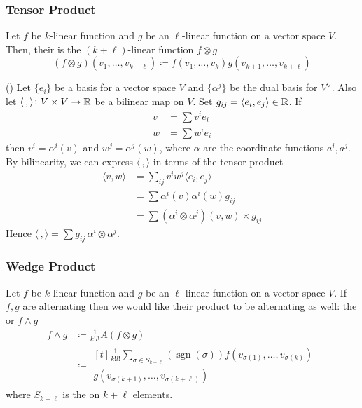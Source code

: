 \subsubsection{Tensor Product}

Let \(f\) be \(k\)-linear function and \(g\) be an \(\ell\)-linear function on a vector space \(V\). Then, their  is the \((k+\ell)\)-linear function \(f\otimes g\)
\begin{equation}
    (f \otimes g) (v_1, \dots, v_{k+\ell}) \coloneqq f(v_1, \dots, v_k)g(v_{k+1}, \dots, v_{k+\ell})
\end{equation}

\begin{example}{}{}
    () Let \(\{e_i\}\) be a basis for a vector space \(V\) and \(\{\alpha^j\}\) be the dual basis for \(V^\vee\). Also let \(\langle\,,\rangle\colon V \times V \rightarrow \mathbb{R}\) be a bilinear map on \(V\). Set \(g_{ij} = \langle e_i, e_j \rangle\in \mathbb{R}\). If
    \begin{align}
        v & = \sum v^i e_i \\
        w & = \sum w^i e_i
    \end{align}
    then \(v^i = \alpha^i(v)\) and \(w^j = \alpha^j(w)\), where \(\alpha\) are the coordinate functions \(a^i, a^j\). By bilinearity, we can express \(\langle\,,\rangle\) in terms of the tensor product
    \begin{equation}
        \begin{split}
            \langle v,w \rangle &= \sum_{ij} v^i w^j \langle e_i, e_j\rangle \\
            &= \sum \alpha^i(v) \alpha^i(w) g_{ij} \\
            &= \sum (\alpha^i \otimes \alpha^j)(v,w) \times g_{ij}
        \end{split}
    \end{equation}
    Hence \(\langle\,,\rangle = \sum g_{ij}\, \alpha^i \otimes \alpha^j\).
\end{example}

\subsubsection{Wedge Product}

Let \(f\) be \(k\)-linear function and \(g\) be an \(\ell\)-linear function on a vector space \(V\).
If  \(f,g\) are alternating then we would like their product to be alternating as well: the  or  \(f \wedge g\)
\begin{align}
    f \wedge g & \coloneqq \frac{1}{k!l!}  A(f \otimes g) \\
               & \coloneqq 
               \begin{multlined}[t]
                    \frac{1}{k!l!}  \sum_{\sigma \in S_{k+\ell}} (\operatorname{sgn}(\sigma)) f(v_{\sigma(1)}, \dots, v_{\sigma(k)}) \\ 
                    g(v_{\sigma(k+1)}, \dots, v_{\sigma(k+\ell)})
                \end{multlined}
\end{align}
where \(S_{k+\ell}\) is the  on \(k+\ell\) elements.

